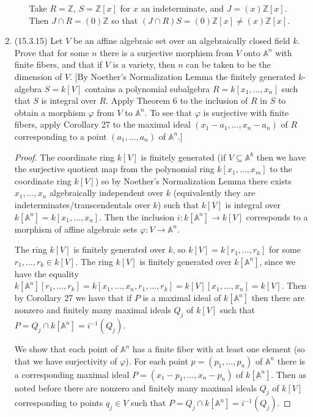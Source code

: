 \documentclass[11pt]{article}
\begin{document}
\begin{enumerate}
\begin{enumerate}
        Take $R = \mathbb{Z}$, $S = \mathbb{Z}[x]$ for $x$ an indeterminate, and $J = (x)\mathbb{Z}[x]$. Then $J\cap R = (0)\mathbb{Z}$ so that $(J\cap R)S = (0)\mathbb{Z}[x]\neq (x)\mathbb{Z}[x]$.
    \end{enumerate}
    \item (15.3.15) Let $V$ be an affine algebraic set over an algebraically closed field $k$. Prove that for some $n$ there is a surjective morphism from $V$ onto $\mathbb{A}^n$ with finite fibers, and that if $V$ is a variety, then $n$ can be taken to be the dimension of $V$. [By Noether's Normalization Lemma the finitely generated $k$-algebra $S = k[V]$ contains a polynomial subalgebra $R = k[x_1,\dots,x_n]$ such that $S$ is integral over $R$. Apply Theorem 6 to the inclusion of $R$ in $S$ to obtain a morphism $\varphi$ from $V$ to $\mathbb{A}^n$. To see that $\varphi$ is surjective with finite fibers, apply Corollary 27 to the maximal ideal $(x_1-a_1,\dots,x_n-a_n)$ of $R$ corresponding to a point $(a_1,\dots,a_n)$ of $\mathbb{A}^n$.] \begin{proof}
        The coordinate ring $k[V]$ is finitely generated (if $V\subseteq \mathbb{A}^k$ then we have the surjective quotient map from the polynomial ring $k[x_1,\dots,x_m]$ to the coordinate ring $k[V]$) so by Noether's Normalization Lemma there exists $x_1,\dots,x_n$ algebraically independent over $k$ (equivalently they are indeterminates/transcendentals over $k$) such that $k[V]$ is integral over $k[\mathbb{A}^n] = k[x_1,\dots,x_n]$. Then the inclusion $i\colon k[\mathbb{A}^n]\to k[V]$ corresponds to a morphism of affine algebraic sets $\varphi\colon V\to \mathbb{A}^n$.

        The ring $k[V]$ is finitely generated over $k$, so $k[V] = k[r_1,\dots,r_k]$ for some $r_1,\dots,r_k\in k[V]$. The ring $k[V]$ is finitely generated over $k[\mathbb{A}^n]$, since we have the equality $k[\mathbb{A}^n][r_1,\dots,r_k] = k[x_1,\dots ,x_n,r_1,\dots,r_k] = k[V][x_1,\dots,x_n] = k[V]$. Then by Corollary 27 we have that if $P$ is a maximal ideal of $k[\mathbb{A}^n]$ then there are nonzero and finitely many maximal ideals $Q_j$ of $k[V]$ such that $P = Q_j\cap k[\mathbb{A}^n] = i^{-1}(Q_j)$.

        We show that each point of $\mathbb{A}^n$ has a finite fiber with at least one element (so that we have surjectivity of $\varphi$). For each point $p = (p_1,\dots,p_n)$ of $\mathbb{A}^n$ there is a corresponding maximal ideal $P = (x_1-p_1,\dots,x_n-p_n)$ of $k[\mathbb{A}^n]$. Then as noted before there are nonzero and finitely many maximal ideals $Q_j$ of $k[V]$ corresponding to points $q_j\in V$ such that $P = Q_j\cap k[\mathbb{A}^n] = i^{-1}(Q_j)$.
        

\end{proof}
\end{enumerate}
\end{document}
